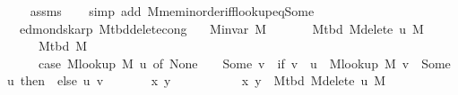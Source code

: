 \begin{isabellebody}
\endisataginvisible
{\isafoldinvisible}%
%
\isadeliminvisible
\isanewline
%
\endisadeliminvisible
%
\isadelimproof
\ \ %
\endisadelimproof
%
\isatagproof
{}\isamarkupfalse%
\ assms\isanewline
\ \ \isamarkupfalse%
\ {\isacharparenleft}{\kern0pt}simp\ add{\isacharcolon}{\kern0pt}\ M{\isachardot}{\kern0pt}mem{\isacharunderscore}{\kern0pt}inorder{\isacharunderscore}{\kern0pt}iff{\isacharunderscore}{\kern0pt}lookup{\isacharunderscore}{\kern0pt}eq{\isacharunderscore}{\kern0pt}Some{\isacharparenright}{\kern0pt}%
\endisatagproof
{\isafoldproof}%
%
\isadelimproof
\isanewline
%
\endisadelimproof
%
\isadeliminvisible
\isanewline
%
\endisadeliminvisible
%
\isataginvisible
{}\isamarkupfalse%
\ {\isacharparenleft}{\kern0pt}\ edmonds{\isacharunderscore}{\kern0pt}karp{\isacharparenright}{\kern0pt}\ M{\isacharunderscore}{\kern0pt}tbd{\isacharunderscore}{\kern0pt}delete{\isacharunderscore}{\kern0pt}cong{\isacharcolon}{\kern0pt}\isanewline
\ \ \ {\isachardoublequoteopen}M{\isachardot}{\kern0pt}invar\ M{\isachardoublequoteclose}\isanewline
\ \ \isanewline
\ \ \ \ {\isachardoublequoteopen}M{\isacharunderscore}{\kern0pt}tbd\ {\isacharparenleft}{\kern0pt}M{\isacharunderscore}{\kern0pt}delete\ u\ M{\isacharparenright}{\kern0pt}\ {\isacharequal}{\kern0pt}\isanewline
\ \ \ \ \ M{\isacharunderscore}{\kern0pt}tbd\ M\ {\isacharminus}{\kern0pt}\isanewline
\ \ \ \ \ {\isacharparenleft}{\kern0pt}case\ M{\isacharunderscore}{\kern0pt}lookup\ M\ u\ of\ None\ {\isasymRightarrow}\ {\isacharbraceleft}{\kern0pt}{\isacharbraceright}{\kern0pt}\ {\isacharbar}{\kern0pt}\ Some\ v\ {\isasymRightarrow}\ if\ v\ {\isasymnoteq}\ u\ {\isasymand}\ M{\isacharunderscore}{\kern0pt}lookup\ M\ v\ {\isacharequal}{\kern0pt}\ Some\ u\ then\ {\isacharbraceleft}{\kern0pt}{\isacharbraceright}{\kern0pt}\ else\ {\isacharbraceleft}{\kern0pt}{\isacharbraceleft}{\kern0pt}u{\isacharcomma}{\kern0pt}\ v{\isacharbraceright}{\kern0pt}{\isacharbraceright}{\kern0pt}{\isacharparenright}{\kern0pt}{\isachardoublequoteclose}%
\endisataginvisible
{\isafoldinvisible}%
%
\isadeliminvisible
\isanewline
%
\endisadeliminvisible
%
\isadelimproof
%
\endisadelimproof
%
\isatagproof
{}\isamarkupfalse%
\ {\isacharminus}{\kern0pt}\isanewline
\ \ \isacommand{{\isacharbraceleft}{\kern0pt}}\isamarkupfalse%
\ \isamarkupfalse%
\ x\ y\isanewline
\ \ \ \ \isamarkupfalse%
\isanewline
\ \ \ \ \ \ {\isachardoublequoteopen}{\isacharbraceleft}{\kern0pt}x{\isacharcomma}{\kern0pt}\ y{\isacharbraceright}{\kern0pt}\ {\isasymin}\ M{\isacharunderscore}{\kern0pt}tbd\ {\isacharparenleft}{\kern0pt}M{\isacharunderscore}{\kern0pt}delete\ u\ M{\isacharparenright}{\kern0pt}\ {\isasymlongleftrightarrow}\isanewline

\end{isabellebody}
